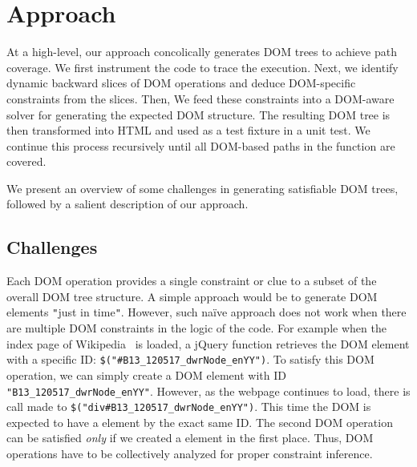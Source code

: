 \section{Approach}

At a high-level, our approach concolically generates DOM trees to achieve path coverage. We first instrument the \js code to trace the execution. Next, we identify dynamic backward slices of DOM operations and deduce DOM-specific constraints from the slices. Then, We feed these constraints into a DOM-aware solver for generating the expected DOM structure. 
The resulting DOM tree is then transformed into HTML and used as a test fixture in a \js unit test. We continue this process recursively until all DOM-based paths in the \js function are covered.

We present an overview of some challenges in generating satisfiable DOM trees, followed by a salient description of our approach.

\subsection{Challenges}

Each DOM operation provides a single constraint or clue to a subset of the overall DOM tree structure. A simple approach would be to generate DOM elements {\tt "}just in time{\tt "}.  
However, such na\"ive approach does not work when there are multiple DOM constraints in the logic of the code. 
For example when the index page of Wikipedia~\cite{wikipedia} is loaded,  a jQuery function retrieves the DOM element with a specific ID: {\tt \$("\#B13\_120517\_dwrNode\_enYY")}.
To satisfy this DOM operation, we can simply create a DOM element with ID {\tt "B13\_120517\_dwrNode\_enYY"}.  
However, as the webpage continues to load, there is call made to {\tt \$("div\#B13\_120517\_dwrNode\_enYY")}.  
This time the DOM is expected to have a  element by the exact same ID.  
The second DOM operation can be satisfied {\em only} if we created a  element in the first place.  Thus, DOM operations have to be collectively analyzed for proper constraint inference.

